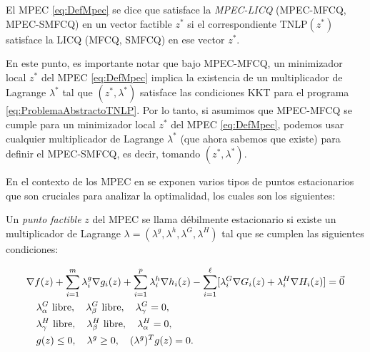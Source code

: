 \begin{definition}
El MPEC \eqref{eq:DefMpec} se dice que satisface la \textit{MPEC-LICQ} (MPEC-MFCQ, MPEC-SMFCQ) en un vector factible $z^*$ si el correspondiente TNLP$(z^*)$ satisface la LICQ (MFCQ, SMFCQ) en ese vector $z^*$.
\end{definition}
    
En este punto, es importante notar que bajo MPEC-MFCQ, un minimizador local $z^*$ del MPEC \eqref{eq:DefMpec} implica la existencia de un multiplicador de Lagrange $\lambda^*$ tal que $(z^*, \lambda^*)$ satisface las condiciones KKT para el programa \eqref{eq:ProblemaAbstractoTNLP}. Por lo tanto, si asumimos que MPEC-MFCQ se cumple para un minimizador local $z^*$ del MPEC \eqref{eq:DefMpec}, podemos usar cualquier multiplicador de Lagrange $\lambda^*$ (que ahora sabemos que existe) para definir el MPEC-SMFCQ, es decir, tomando $(z^*, \lambda^*)$.

En el contexto de los MPEC en \cite{Flegel2003AFJ} se exponen varios tipos de puntos estacionarios que son cruciales para analizar la optimalidad, los cuales son los siguientes:
\begin{definition}
    Un \textit{punto factible} $z$ del MPEC se llama débilmente estacionario si existe un multiplicador de Lagrange $\lambda = (\lambda^g, \lambda^h, \lambda^G, \lambda^H)$ tal que se cumplen las siguientes condiciones:
    
\begin{align}
& \nabla f(z) + \sum_{i=1}^m \lambda_i^g\nabla g_i(z) + \sum_{i=1}^p \lambda_i^h\nabla h_i(z) - \sum_{i=1}^{\ell} [\lambda_i^G\nabla G_i(z) + \lambda_i^H\nabla H_i(z)] = \vec{0} \notag\\
    & \quad \begin{aligned}
        & \lambda_\alpha^G \text{ libre}, \quad \lambda_\beta^G \text{ libre}, \quad \lambda_\gamma^G = 0, \\
        & \lambda_\gamma^H \text{ libre}, \quad \lambda_\beta^H \text{ libre}, \quad \lambda_\alpha^H = 0, \\
        & g(z) \leq 0, \quad \lambda^g \geq 0, \quad (\lambda^g)^T g(z) = 0.
    \end{aligned} \\
& \label{eq:Definicion_punto_debilemente_estacionario} \notag
\end{align}
\end{definition}

